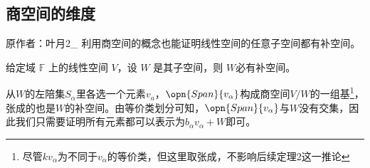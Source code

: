 \subsection{商空间的维度}




% 


原作者：叶月2_
利用商空间的概念也能证明线性空间的任意子空间都有补空间。
\begin{theorem}{}\label{the_lnal06_1}
给定域 $\mathbb F$ 上的线性空间 $V$，设 $W$ 是其子空间，则 $W$必有补空间。
\end{theorem}
从$W$的左陪集${S_{\alpha}}$里各选一个元素$v_a$，$\opn{Span} \{v_{\alpha}\}$构成商空间$V/W$的一组基\footnote{尽管$kv_\alpha$为不同于$v_\alpha$的等价类，但这里取张成，不影响后续定理2这一推论}，张成的也是$W$的补空间。由等价类划分可知，$\opn{Span} \{v_{\alpha}\}$与$W$没有交集，因此我们只需要证明所有元素都可以表示为$b_{\alpha}v_{\alpha} + W$即可。

